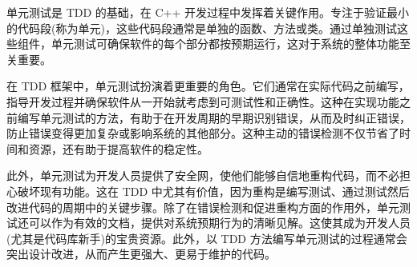 单元测试是 TDD 的基础，在 C++ 开发过程中发挥着关键作用。专注于验证最小的代码段(称为单元)，这些代码段通常是单独的函数、方法或类。通过单独测试这些组件，单元测试可确保软件的每个部分都按预期运行，这对于系统的整体功能至关重要。

在 TDD 框架中，单元测试扮演着更重要的角色。它们通常在实际代码之前编写，指导开发过程并确保软件从一开始就考虑到可测试性和正确性。这种在实现功能之前编写单元测试的方法，有助于在开发周期的早期识别错误，从而及时纠正错误，防止错误变得更加复杂或影响系统的其他部分。这种主动的错误检测不仅节省了时间和资源，还有助于提高软件的稳定性。

此外，单元测试为开发人员提供了安全网，使他们能够自信地重构代码，而不必担心破坏现有功能。这在 TDD 中尤其有价值，因为重构是编写测试、通过测试然后改进代码的周期中的关键步骤。除了在错误检测和促进重构方面的作用外，单元测试还可以作为有效的文档，提供对系统预期行为的清晰见解。这使其成为开发人员(尤其是代码库新手)的宝贵资源。此外，以 TDD 方法编写单元测试的过程通常会突出设计改进，从而产生更强大、更易于维护的代码。
